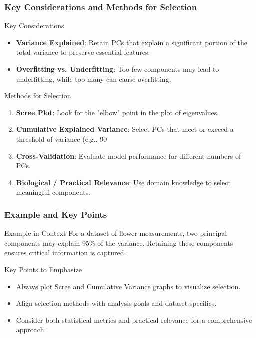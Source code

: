 \documentclass[aspectratio=169]{beamer}
\begin{document}
\begin{frame}[fragile]
    \frametitle{Key Considerations and Methods for Selection}
    \begin{block}{Key Considerations}
        \begin{itemize}
            \item \textbf{Variance Explained}: Retain PCs that explain a significant portion of the total variance to preserve essential features.
            \item \textbf{Overfitting vs. Underfitting}: Too few components may lead to underfitting, while too many can cause overfitting.
        \end{itemize}
    \end{block}
    
    \begin{block}{Methods for Selection}
        \begin{enumerate}
            \item \textbf{Scree Plot}: Look for the "elbow" point in the plot of eigenvalues.
            \item \textbf{Cumulative Explained Variance}: Select PCs that meet or exceed a threshold of variance (e.g., 90%
            \item \textbf{Cross-Validation}: Evaluate model performance for different numbers of PCs.
            \item \textbf{Biological / Practical Relevance}: Use domain knowledge to select meaningful components.
        \end{enumerate}
    \end{block}
\end{frame}

\begin{frame}[fragile]
    \frametitle{Example and Key Points}
    \begin{block}{Example in Context}
        For a dataset of flower measurements, two principal components may explain 95\% of the variance. Retaining these components ensures critical information is captured.
    \end{block}
    
    \begin{block}{Key Points to Emphasize}
        \begin{itemize}
            \item Always plot Scree and Cumulative Variance graphs to visualize selection.
            \item Align selection methods with analysis goals and dataset specifics.
            \item Consider both statistical metrics and practical relevance for a comprehensive approach.
        \end{itemize}
    \end{block}
\end{frame}
\end{document}

